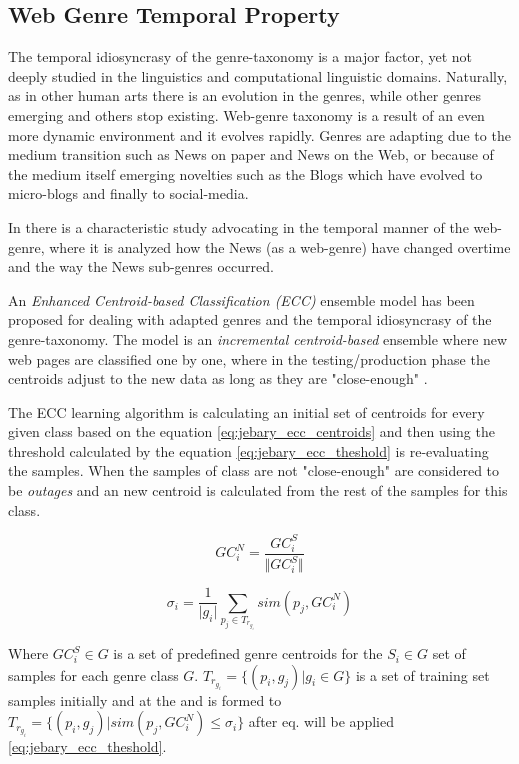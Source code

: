 \subsection{Web Genre Temporal Property}
The temporal idiosyncrasy of the genre-taxonomy is a major factor, yet not deeply studied in the linguistics and computational linguistic domains. Naturally, as in other human arts there is an evolution in the genres, while other genres emerging and others stop existing. Web-genre taxonomy is a result of an even more dynamic environment and it evolves rapidly. Genres are adapting due to the medium transition such as News on paper and News on the Web, or because of the medium itself emerging novelties such as the Blogs which have evolved to micro-blogs and finally to social-media. 

In \parencite{caple2017genre} there is a characteristic study advocating in the temporal manner of the web-genre, where it is analyzed how the News (as a web-genre) have changed overtime and the way the News sub-genres occurred.

An \textit{Enhanced Centroid-based Classification (ECC)} ensemble model has been proposed for dealing with adapted genres and the temporal idiosyncrasy of the genre-taxonomy. The model is an \textit{incremental centroid-based} ensemble where new web pages are classified one by one, where in the testing/production phase the centroids adjust to the new data as long as they are "close-enough" \parencite{jebari2015combination}.

The ECC learning algorithm is calculating an initial set of centroids for every given class based on the equation \ref{eq:jebary_ecc_centroids} and then using the threshold calculated by the equation \ref{eq:jebary_ecc_theshold} is re-evaluating the samples. When the samples of  class are not "close-enough" are considered to be \textit{outages} and an new centroid is calculated from the rest of the samples for this class. 

\begin{equation}\label{eq:jebary_ecc_centroids}
	GC_{i}^{N} = \frac{GC^{S}_{i}}{\Vert GC^{S}_{i}\Vert }
\end{equation}

\begin{equation}\label{eq:jebary_ecc_theshold}
	\sigma_{i} = \frac{1}{\vert g_{i} \vert } \sum_{p_{j} \in T_{r_{g_{i}}}} sim(p_{j}, GC_{i}^{N})
\end{equation}

Where $GC^{S}_{i} \in G$ is a set of predefined genre centroids for the $S_{i} \in G$ set of samples for each genre class $G$. $T_{r_{g_{i}}} =   \{ (p_{i}, g_{j}) \vert g_{i} \in G  \}$ is a set of training set samples initially and at the and is formed to $T_{r_{g_{i}}} =   \{ (p_{i}, g_{j}) \vert sim(p_{j}, GC^{N}_{i}) \leq \sigma_{i} \}$  after eq. will be applied \ref{eq:jebary_ecc_theshold}.

